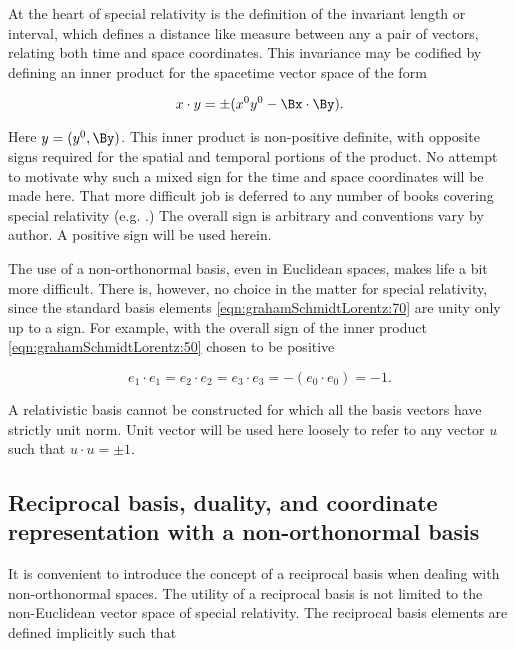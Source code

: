 At the heart of special relativity is the definition of the invariant length or interval, which defines a distance like measure between any a pair of vectors, relating both time and space coordinates.  This invariance may be codified by defining an inner product for the spacetime vector space of the form

\begin{equation}\label{eqn:grahamSchmidtLorentz:50}
x \cdot y = \pm( x^0 y^0 - \Bx \cdot \By ).
\end{equation}

Here $y = (y^0, \By)$.  This inner product is non-positive definite, with opposite signs required for the spatial and temporal portions of the product.
No attempt to motivate why such a mixed sign for the time and space coordinates will be made here.  That more difficult job is deferred to any number of books covering special relativity
(e.g. \citep{landau1980classical}.)
The overall sign is arbitrary and conventions vary by author.  A positive sign will be used herein.

The use of a non-orthonormal basis, even in Euclidean spaces, makes life a bit more difficult.  There is, however, no choice in the matter for special relativity, since the standard basis elements \ref{eqn:grahamSchmidtLorentz:70} are unity only up to a sign.  For example, with the overall sign of the inner product \ref{eqn:grahamSchmidtLorentz:50} chosen to be positive

\begin{equation}\label{eqn:grahamSchmidtLorentz:860}
e_1 \cdot e_1 = e_2 \cdot e_2 = e_3 \cdot e_3 = -( e_0 \cdot e_0 ) = -1.
\end{equation}

A relativistic basis cannot be constructed for which all the basis vectors have strictly unit norm.  Unit vector will be used here loosely to refer to any vector $u$ such that $u \cdot u = \pm 1$.

\subsection{Reciprocal basis, duality, and coordinate representation with a non-orthonormal basis}

It is convenient to introduce the concept of a reciprocal basis when dealing with non-orthonormal spaces.  The utility of a reciprocal basis is not limited to the non-Euclidean vector space of special relativity.  The reciprocal basis elements are defined implicitly such that

